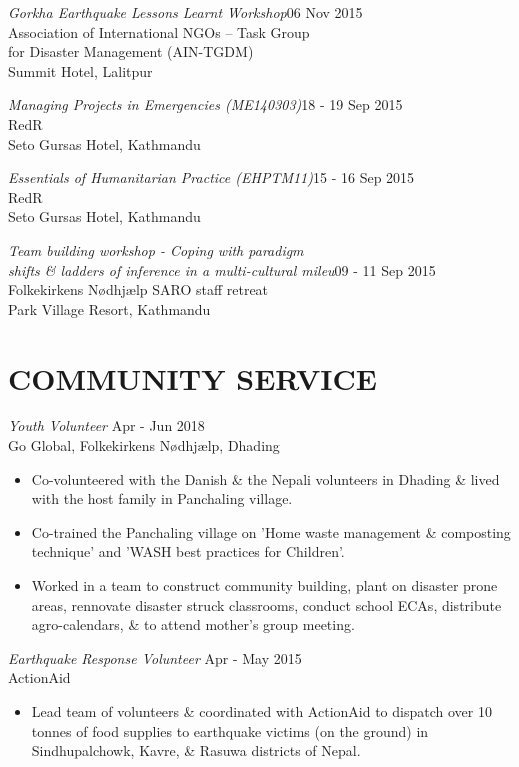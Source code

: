 \documentclass[margin, 10pt]{res}
\begin{document}
\begin{resume}
\emph{Gorkha Earthquake Lessons Learnt Workshop}\hfill 06 Nov 2015\\
Association of International NGOs – Task Group\\ for Disaster Management (AIN-TGDM)\\
Summit Hotel, Lalitpur

\emph{Managing Projects in Emergencies (ME140303)}\hfill 18 - 19 Sep 2015\\
RedR\\
Seto Gursas Hotel, Kathmandu

\emph{Essentials of Humanitarian Practice (EHPTM11)}\hfill 15 - 16 Sep 2015\\
RedR\\
Seto Gursas Hotel, Kathmandu

\emph{Team building workshop - Coping with paradigm \\shifts \& ladders of inference in a multi-cultural mileu}\hfill 09 - 11 Sep 2015\\
Folkekirkens Nødhjælp SARO staff retreat\\
Park Village Resort, Kathmandu

\section{COMMUNITY SERVICE}
\emph{Youth Volunteer} \hfill Apr - Jun 2018\\
Go Global, Folkekirkens Nødhjælp, Dhading
\begin{itemize}
	\item Co-volunteered with the Danish \& the Nepali volunteers in Dhading \& lived with the host family in Panchaling village.
	\item Co-trained the Panchaling village on 'Home waste management \& composting technique' and 'WASH best practices for Children'.
	\item Worked in a team to construct community building, plant on disaster prone areas, rennovate disaster struck classrooms, conduct school ECAs, distribute agro-calendars, \& to attend mother's group meeting. 
\end{itemize}

\emph{Earthquake Response Volunteer} \hfill Apr - May 2015\\
ActionAid
\begin{itemize}
	\item Lead team of volunteers \& coordinated with ActionAid to dispatch over 10 tonnes of food supplies to earthquake victims (on the ground) in Sindhupalchowk, Kavre, \& Rasuwa districts of Nepal.
\end{itemize}


\end{resume}
\end{document}

